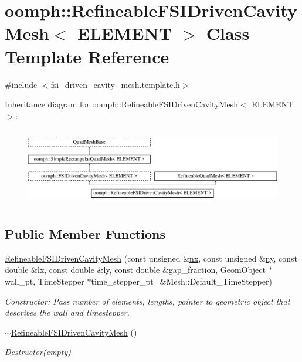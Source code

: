 \hypertarget{classoomph_1_1RefineableFSIDrivenCavityMesh}{}\section{oomph\+:\+:Refineable\+F\+S\+I\+Driven\+Cavity\+Mesh$<$ E\+L\+E\+M\+E\+NT $>$ Class Template Reference}
\label{classoomph_1_1RefineableFSIDrivenCavityMesh}


{\ttfamily \#include $<$fsi\+\_\+driven\+\_\+cavity\+\_\+mesh.\+template.\+h$>$}

Inheritance diagram for oomph\+:\+:Refineable\+F\+S\+I\+Driven\+Cavity\+Mesh$<$ E\+L\+E\+M\+E\+NT $>$\+:\begin{figure}[H]
\begin{center}
\leavevmode
\includegraphics[height=3.404255cm]{classoomph_1_1RefineableFSIDrivenCavityMesh}
\end{center}
\end{figure}
\subsection*{Public Member Functions}
\begin{DoxyCompactItemize}
\item 
\hyperlink{classoomph_1_1RefineableFSIDrivenCavityMesh_a91c0ab00784098cb0e583ab0882b0e0e}{Refineable\+F\+S\+I\+Driven\+Cavity\+Mesh} (const unsigned \&\hyperlink{classoomph_1_1SimpleRectangularQuadMesh_a4ff7678ec433180e2245ea2147f222b7}{nx}, const unsigned \&\hyperlink{classoomph_1_1SimpleRectangularQuadMesh_a45011f22dedd480392b1f376e4269921}{ny}, const double \&lx, const double \&ly, const double \&gap\+\_\+fraction, Geom\+Object $\ast$wall\+\_\+pt, Time\+Stepper $\ast$time\+\_\+stepper\+\_\+pt=\&Mesh\+::\+Default\+\_\+\+Time\+Stepper)
\begin{DoxyCompactList}\small\item\em Constructor\+: Pass number of elements, lengths, pointer to geometric object that describes the wall and timestepper. \end{DoxyCompactList}\item 
\hyperlink{classoomph_1_1RefineableFSIDrivenCavityMesh_a01e9f73b3d9344b6df2aeda2c57de628}{$\sim$\+Refineable\+F\+S\+I\+Driven\+Cavity\+Mesh} ()
\begin{DoxyCompactList}\small\item\em Destructor(empty) \end{DoxyCompactList}\end{DoxyCompactItemize}
